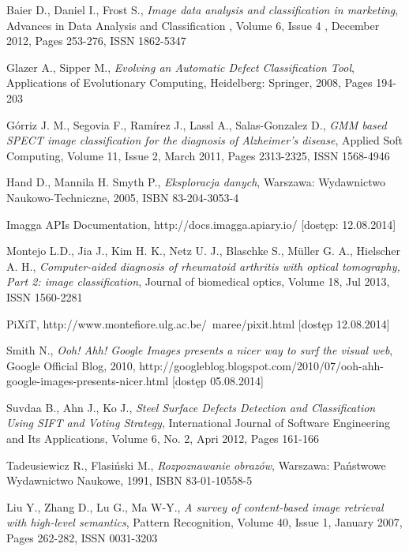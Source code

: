 \documentclass[a4paper,12pt]{book}
\begin{document}
\begin{thebibliography}{100} %

 Baier D., Daniel I., Frost S., \emph{Image data analysis and classification in marketing}, Advances in Data Analysis and Classification , Volume 6, Issue 4 , December 2012, Pages 253-276, ISSN 1862-5347

 Glazer A., Sipper M., \emph{Evolving an Automatic Defect Classification Tool}, Applications of Evolutionary Computing, Heidelberg: Springer, 2008, Pages 194-203

 Górriz J. M., Segovia F., Ramírez J., Lassl A., Salas-Gonzalez D., \emph{GMM based SPECT image classification for the diagnosis of Alzheimer’s disease}, Applied Soft Computing, Volume 11, Issue 2, March 2011, Pages 2313-2325, ISSN 1568-4946

 Hand D., Mannila H. Smyth P., \emph{Eksploracja danych}, Warszawa: Wydawnictwo Naukowo-Techniczne, 2005, ISBN 83-204-3053-4

 Imagga APIs Documentation, http://docs.imagga.apiary.io/ [dostęp: 12.08.2014]

 Montejo L.D., Jia J., Kim H. K., Netz U. J., Blaschke S., Müller G. A., Hielscher A. H., \emph{Computer-aided diagnosis of rheumatoid arthritis with optical tomography, Part 2: image classification}, Journal of biomedical optics, Volume 18, Jul 2013, ISSN 1560-2281

 PiXiT, http://www.montefiore.ulg.ac.be/~maree/pixit.html [dostęp 12.08.2014]

 Smith N., \emph{Ooh! Ahh! Google Images presents a nicer way to surf the visual web}, Google Official Blog, 2010, http://googleblog.blogspot.com/2010/07/ooh-ahh-google-images-presents-nicer.html [dostęp 05.08.2014]

 Suvdaa B., Ahn J., Ko J., \emph{Steel Surface Defects Detection and Classification Using SIFT and Voting Strategy}, International Journal of Software Engineering and Its Applications, Volume 6, No. 2, Apri 2012, Pages 161-166


 Tadeusiewicz R., Flasiński M., \emph{Rozpoznawanie obrazów}, Warszawa: Państwowe Wydawnictwo Naukowe, 1991, ISBN 83-01-10558-5

 Liu Y., Zhang D., Lu G., Ma W-Y., \emph{A survey of content-based image retrieval with high-level semantics}, Pattern Recognition, Volume 40, Issue 1, January 2007, Pages 262-282, ISSN 0031-3203
 
\end{thebibliography} 
\end{document}
